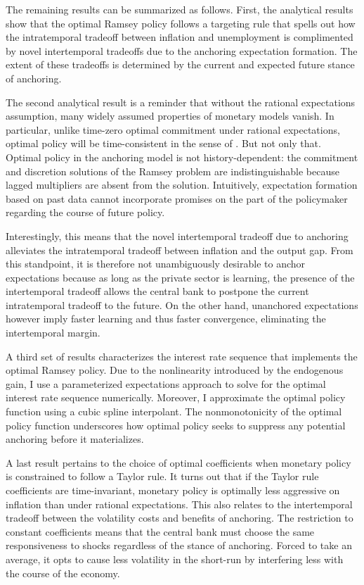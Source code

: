 \documentclass[11pt]{article}
\renewcommand{\[}{\begin{equation}}
\renewcommand{\]}{\end{equation}}
\begin{document}
The remaining results can be summarized as follows.  First, the analytical results show that the optimal Ramsey policy follows a targeting rule that spells out how the intratemporal tradeoff between inflation and unemployment is complimented by novel intertemporal tradeoffs due to the anchoring expectation formation. The extent of these tradeoffs is determined by the current and expected future stance of anchoring. 

The second analytical result is a reminder that without the rational expectations assumption, many widely assumed properties of monetary models vanish. In particular, unlike time-zero optimal commitment under rational expectations, optimal policy will be time-consistent in the sense of \cite{kydland1977rules}. But not only that. Optimal policy in the anchoring model is not history-dependent: the commitment and discretion solutions of the Ramsey problem are indistinguishable because lagged multipliers are absent from the solution. Intuitively, expectation formation based on past data cannot incorporate promises on the part of the policymaker regarding the course of future policy. 

Interestingly, this means that the novel intertemporal tradeoff due to anchoring alleviates the intratemporal tradeoff between inflation and the output gap. From this standpoint, it is therefore not unambiguously desirable to anchor expectations because as long as the private sector is learning, the presence of the intertemporal tradeoff allows the central bank to postpone the current intratemporal tradeoff to the future. On the other hand, unanchored expectations however imply faster learning and thus faster convergence, eliminating the intertemporal margin. 

A third set of results characterizes the interest rate sequence that implements the optimal Ramsey policy. Due to the nonlinearity introduced by the endogenous gain, I use a parameterized expectations approach to solve for the optimal interest rate sequence numerically. Moreover, I approximate the optimal policy function using a cubic spline interpolant. The nonmonotonicity of the optimal policy function underscores how optimal policy seeks to suppress any potential anchoring before it materializes.

A last result pertains to the choice of optimal coefficients when monetary policy is constrained to follow a Taylor rule.  It turns out that if the Taylor rule coefficients are time-invariant, monetary policy is optimally less aggressive on inflation than under rational expectations. This also relates to the intertemporal tradeoff between the volatility costs and benefits of anchoring. The restriction to constant coefficients means that the central bank must choose the same responsiveness to shocks regardless of the stance of anchoring. Forced to take an average, it opts to cause less volatility in the short-run by interfering less with the course of the economy.
\end{document}
